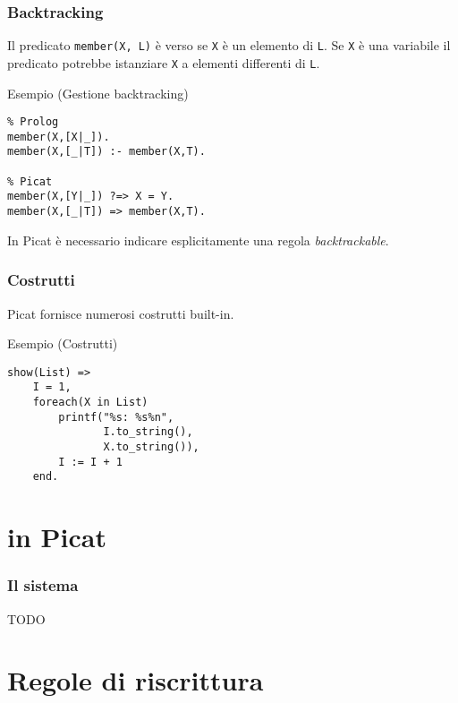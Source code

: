 \documentclass{beamer}
\begin{document}

\begin{frame}[fragile]
  \frametitle{Backtracking} 
  Il predicato \texttt{member(X, L)} è verso se \texttt{X} è un elemento di \texttt{L}. Se \texttt{X} è una variabile il predicato potrebbe istanziare \texttt{X} a elementi differenti di \texttt{L}.
  
  \begin{exampleblock}{Esempio (Gestione backtracking)}
\begin{verbatim}
% Prolog 
member(X,[X|_]).
member(X,[_|T]) :- member(X,T).

% Picat
member(X,[Y|_]) ?=> X = Y.
member(X,[_|T]) => member(X,T).
\end{verbatim}
  \end{exampleblock}
  In Picat è necessario indicare esplicitamente una regola \emph{backtrackable}.
\end{frame}


\begin{frame}[fragile]
  \frametitle{Costrutti} 
  Picat fornisce numerosi costrutti built-in.
  \begin{exampleblock}{Esempio (Costrutti)}
\begin{verbatim}
show(List) =>
    I = 1,
    foreach(X in List)
        printf("%s: %s%n", 
               I.to_string(), 
               X.to_string()),
        I := I + 1
    end.
\end{verbatim}
  \end{exampleblock}
\end{frame}


\section{\lset{} in Picat}

\begin{frame}
  \frametitle{Il sistema}
  TODO
\end{frame}

\section{Regole di riscrittura}
\end{document}
